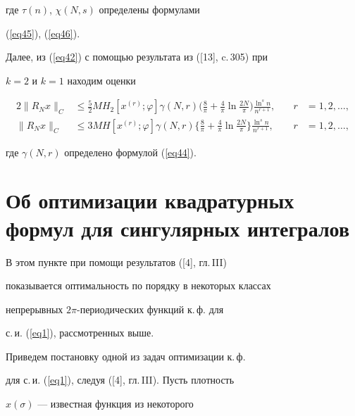 где $\tau(n)$, $\chi(N,s)$ определены формулами


(\ref{eq45}), (\ref{eq46}).





Далее, из (\ref{eq42}) с помощью результата из ([13], c.\,305) при


$k=2$ и $k=1$ находим оценки


\begin{alignat*}{2}


\|R_Nx\|_C&\leq\frac{5}{2}M H_2[x^{(r)}; \varphi]\gamma(N,r)


\bigg(\frac{8}{\pi} + \frac{4}{\pi}\ln\frac{2N}{\pi}\bigg)


\frac{\ln^sn}{n^{r+1}},&\quad r&=1,2,\dotsc,\\


%


\|R_Nx\|_C&\leq3MH[x^{(r)}; \varphi]\gamma(N,r)


\bigg\{\frac{8}{\pi} + \frac{4}{\pi}\ln\frac{2N}{\pi}\bigg\}


\frac{\ln^sn}{n^{r+1}},&\quad r&=1,2,\dotsc,


\end{alignat*}


где $\gamma(N,r)$ определено формулой (\ref{eq44}).








\section{Об оптимизации квадратурных формул для сингулярных интегралов}








В этом пункте при помощи результатов ([4], гл.\,III)


показывается оптимальность по порядку в некоторых классах


непрерывных $2\pi$-периодических функций к.\,ф. для


с.\,и. (\ref{eq1}), рассмотренных выше.





Приведем постановку одной из задач оптимизации к.\,ф.


для с.\,и. (\ref{eq1}), следуя ([4], гл.\,III). Пусть плотность


$x(\sigma)$ --- известная функция из некоторого


